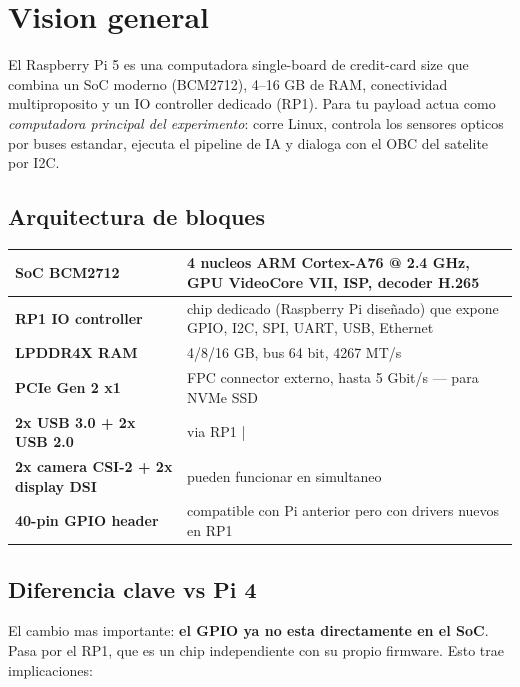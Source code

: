 \documentclass[11pt,a4paper,oneside]{report}
\begin{document}
\tableofcontents
\clearpage

\chapter{Vision general}

El Raspberry Pi 5 es una computadora single-board de credit-card size que
combina un SoC moderno (BCM2712), 4--16 GB de RAM, conectividad
multiproposito y un IO controller dedicado (RP1). Para tu payload actua
como \emph{computadora principal del experimento}: corre Linux, controla
los sensores opticos por buses estandar, ejecuta el pipeline de IA y
dialoga con el OBC del satelite por I2C.

\section{Arquitectura de bloques}

\begin{center}
\begin{tabular}{|p{4cm}|p{10cm}|}
\hline
\textbf{SoC BCM2712} & 4 nucleos ARM Cortex-A76 @ 2.4 GHz, GPU VideoCore VII, ISP, decoder H.265 \\
\hline
\textbf{RP1 IO controller} & chip dedicado (Raspberry Pi diseñado) que expone GPIO, I2C, SPI, UART, USB, Ethernet \\
\hline
\textbf{LPDDR4X RAM} & 4/8/16 GB, bus 64 bit, 4267 MT/s \\
\hline
\textbf{PCIe Gen 2 x1} & FPC connector externo, hasta 5 Gbit/s --- para NVMe SSD \\
\hline
\textbf{2x USB 3.0 + 2x USB 2.0} & via RP1 |
\\
\hline
\textbf{2x camera CSI-2 + 2x display DSI} & pueden funcionar en simultaneo \\
\hline
\textbf{40-pin GPIO header} & compatible con Pi anterior pero con drivers nuevos en RP1 \\
\hline
\end{tabular}
\end{center}

\section{Diferencia clave vs Pi 4}

El cambio mas importante: \textbf{el GPIO ya no esta directamente en el SoC}.
Pasa por el RP1, que es un chip independiente con su propio firmware. Esto
trae implicaciones:
\end{document}
